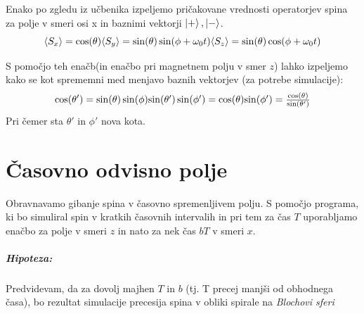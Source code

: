 \documentclass[12pt, a4paper]{article}
\begin{document}
Enako po zgledu iz učbenika izpeljemo pričakovane vrednosti operatorjev spina za polje v smeri osi x in baznimi vektorji $\ket{+},\ket{-}$.
\begin{equation}
\braket{S_x} = \cos(\theta)$$$$
\braket{S_y} = \sin(\theta)\sin(\phi+\omega_0t)$$$$
\braket{S_z} = \sin(\theta)\cos(\phi+\omega_0t)
\end{equation}

S pomočjo teh enačb(in enačbo pri magnetnem polju v smer $z$) lahko izpeljemo kako se kot sprememni med menjavo baznih vektorjev (za potrebe simulacije):
\begin{equation}
\cos(\theta') = \sin(\theta)\sin(\phi)$$$$
\sin(\theta')\sin(\phi') = \cos(\theta)$$$$
\sin(\phi') = \frac{\cos(\theta)}{\sin(\theta')}
\end{equation}
Pri čemer sta $\theta'$ in $\phi'$ nova kota.

\section{Časovno odvisno polje}
Obravnavamo gibanje spina v časovno spremenljivem polju. S pomočjo programa, ki bo simuliral spin v kratkih časovnih intervalih in pri tem za čas $T$ uporabljamo enačbo za polje v smeri $z$ in nato za nek čas $bT$ v smeri $x$. 
\subparagraph{Hipoteza:}
Predvidevam, da za dovolj majhen $T$ in $b$ (tj. T precej manjši od obhodnega časa), bo rezultat simulacije precesija spina v obliki spirale na \textit{Blochovi sferi}
\end{document}
